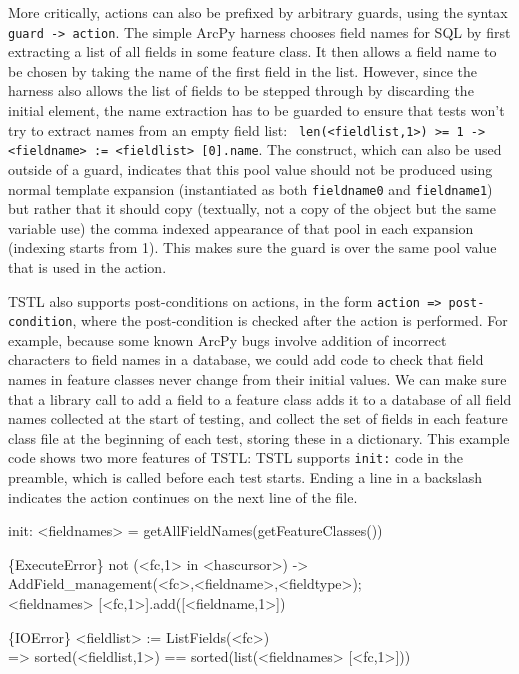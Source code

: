 More critically, actions can also be prefixed by arbitrary guards, using
the syntax {\tt guard -> action}.  The simple ArcPy harness chooses
field names for SQL by first extracting a list of all fields in some
feature class.  It then allows a field name to be chosen by taking the
name of the first field in the list.  However, since the harness also
allows the list of fields to be stepped through by discarding the
initial element, the name extraction has to be guarded to ensure that
tests won't try to extract names from an empty field list:  {\tt
  len(<fieldlist,1>) >= 1 -> <fieldname> := <fieldlist> [0].name}.
The {\tt <fieldlist,1>} construct, which can also be used outside of a
guard, indicates that this pool value should not be produced using
normal template expansion (instantiated as both {\tt fieldname0} and
{\tt fieldname1}) but rather that it should copy (textually, not a
copy of the object but the same variable use) the comma indexed
appearance of that pool in each expansion (indexing starts from 1).  This makes sure the guard
is over the same pool value that is used in the action.

TSTL also supports post-conditions on actions, in the form {\tt action
  => post-condition}, where the post-condition is checked after the
action is performed.  For example, because some known ArcPy bugs
involve addition of incorrect characters to field names in a database,
we could add code to check that field names in feature classes never
change from their initial values.  We can make sure that a library
call to add a field to a feature class adds it to a database of all
field names collected at the start of testing, and collect the set of
fields in each feature class file at the beginning of each test,
storing these in a dictionary.  This example code shows two more
features of TSTL: TSTL supports {\tt init:} code in the preamble,
which is called before each test starts.  Ending a line in a backslash
indicates the action continues on the next line of the file.

{\scriptsize
\begin{code}
init: <fieldnames> = getAllFieldNames(getFeatureClasses())

\{ExecuteError\} not (<fc,1> in <hascursor>) -> \\
   AddField\_management(<fc>,<fieldname>,<fieldtype>); \\
   <fieldnames> [<fc,1>].add([<fieldname,1>])

\{IOError\} <fieldlist> := ListFields(<fc>) \\
  => sorted(<fieldlist,1>) == sorted(list(<fieldnames> [<fc,1>]))
\end{code}
}


